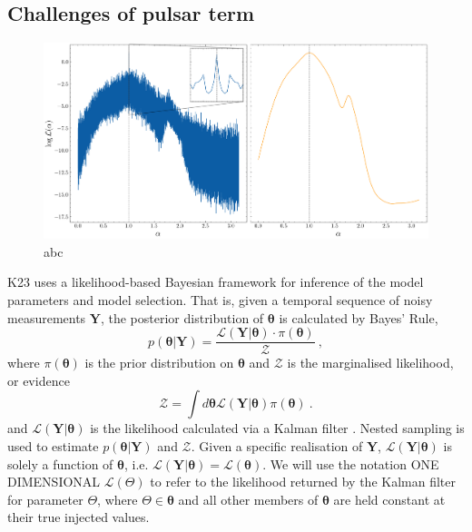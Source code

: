 \documentclass[fleqn,usenatbib,useAMS]{mnras}
\begin{document}
\subsection{Challenges of pulsar term}\label{sec:pulsar_terms_challenge}
\begin{figure}
	\includegraphics[width=\textwidth, height =0.5\textwidth ]{images/Likelihoods_alpha}
	\caption{abc}
	\label{fig:likelihood_comparison}
\end{figure}


K23 uses a likelihood-based Bayesian framework for inference of the model parameters and model selection. That is, given a temporal sequence of noisy measurements $\boldsymbol{Y}$, the posterior distribution of $\boldsymbol{\theta}$ is calculated by 
Bayes' Rule,
\begin{equation}
	p(\boldsymbol{\theta} | \boldsymbol{Y}) = \frac{\mathcal{L}(\boldsymbol{Y} | \boldsymbol{\theta}) \cdot \pi(\boldsymbol{\theta})}{\mathcal{Z}} \ ,
\end{equation}
where $\pi(\boldsymbol{\theta})$ is the prior distribution on $\boldsymbol{\theta}$ and $\mathcal{Z}$ is the marginalised likelihood, or evidence
\begin{equation}
	\mathcal{Z} = \int d \boldsymbol{\theta} \mathcal{L}(\boldsymbol{Y} | \boldsymbol{\theta})  \pi(\boldsymbol{\theta})  \ . \label{eq:model_evidence}
\end{equation}
and $\mathcal{L}(\boldsymbol{Y}| \boldsymbol{\theta})$ is the likelihood calculated via a Kalman filter \citep{Kalman1}. Nested sampling \citep{Skilling} is used to estimate $p(\boldsymbol{\theta} | \boldsymbol{Y})$ and $\mathcal{Z}$. Given a specific realisation of $\boldsymbol{Y}$, $\mathcal{L}(\boldsymbol{Y}| \boldsymbol{\theta})$ is solely a function of $\boldsymbol{\theta}$, i.e. $\mathcal{L}(\boldsymbol{Y}| \boldsymbol{\theta}) = \mathcal{L}(\boldsymbol{\theta})$. We will use the notation ONE DIMENSIONAL $\mathcal{L}(\Theta)$ to refer to the likelihood returned by the Kalman filter for parameter $\Theta$, where $\Theta \in \boldsymbol{\theta}$ and all other members of $\boldsymbol{\theta}$ are held constant at their true injected values. \newline 
\end{document}
